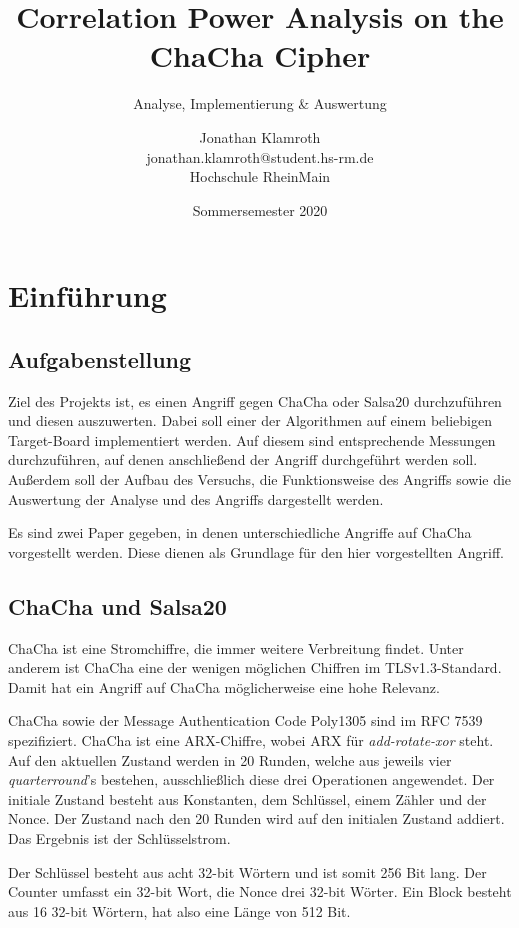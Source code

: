\documentclass[a4paper,ngerman]{scrreprt}
\title{Correlation Power Analysis on the ChaCha Cipher}
\subtitle{Analyse, Implementierung \& Auswertung}
\author{Jonathan Klamroth \\ jonathan.klamroth@student.hs-rm.de \\ Hochschule
RheinMain}
\date{Sommersemester 2020}
\begin{document}
\maketitle

\tableofcontents



\chapter{Einführung}

\section{Aufgabenstellung}

Ziel des Projekts ist, es einen Angriff gegen ChaCha oder Salsa20 durchzuführen
und diesen auszuwerten. Dabei soll einer der Algorithmen auf einem beliebigen
Target-Board implementiert werden. Auf diesem sind entsprechende Messungen
durchzuführen, auf denen anschließend der Angriff durchgeführt werden soll.
Außerdem soll der Aufbau des Versuchs, die Funktionsweise des Angriffs sowie die
Auswertung der Analyse und des Angriffs dargestellt werden.

Es sind zwei Paper \cite{adomnicai_fournier_masson_2017,jungk_bhasin_2017}
gegeben, in denen unterschiedliche Angriffe auf ChaCha vorgestellt werden.
Diese dienen als Grundlage für den hier vorgestellten Angriff.


\section{ChaCha und Salsa20}

ChaCha ist eine Stromchiffre, die immer weitere Verbreitung findet. Unter
anderem ist ChaCha eine der wenigen möglichen Chiffren im TLSv1.3-Standard.
Damit hat ein Angriff auf ChaCha möglicherweise eine hohe Relevanz.

ChaCha sowie der Message Authentication Code Poly1305 sind im RFC 7539
spezifiziert. ChaCha ist eine ARX-Chiffre, wobei ARX für \emph{add-rotate-xor}
steht. Auf den aktuellen Zustand werden in 20 Runden, welche aus jeweils vier
\emph{quarterround}'s bestehen, ausschließlich diese drei Operationen
angewendet. Der initiale Zustand besteht aus Konstanten, dem Schlüssel, einem
Zähler und der Nonce. Der Zustand nach den 20 Runden wird auf den initialen
Zustand addiert. Das Ergebnis ist der Schlüsselstrom.

Der Schlüssel besteht aus acht 32-bit Wörtern und ist somit 256 Bit lang. Der
Counter umfasst ein 32-bit Wort, die Nonce drei 32-bit Wörter. Ein Block besteht
aus 16 32-bit Wörtern, hat also eine Länge von 512 Bit.
\end{document}
